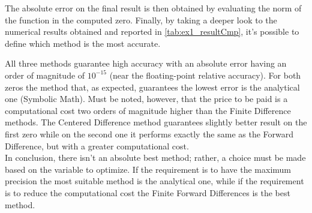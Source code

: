 \documentclass[11pt,a4paper,oneside]{article}
\begin{document}
The absolute error on the final result is then obtained by evaluating the norm of the function in the computed zero. 
Finally, by taking a deeper look to the numerical results obtained and reported in \cref{tab:ex1_resultCmp}, it's possible to define which method is the most accurate.

\begin{table}[ht]
    \centering
    \caption{Methods compare on zeros computation}
    \label{tab:ex1_resultCmp}
    \hspace{0.05\linewidth}     %
\end{table}

All three methods guarantee high accuracy with an absolute error having an order of magnitude of $10^{-15}$ (near the floating-point relative accuracy).
For both zeros the method that, as expected, guarantees the lowest error is the analytical one (Symbolic Math).
Must be noted, however, that the price to be paid is a computational cost two orders of magnitude higher than the Finite Difference methods.
The Centered Difference method guarantees slightly better result on the first zero while on the second one it performs exactly the same as the Forward Difference, but with a greater computational cost.
\\
In conclusion, there isn't an absolute best method; rather, a choice must be made based on the variable to optimize.
If the requirement is to have the maximum precision the most suitable method is the analytical one, while if the requirement is to reduce the computational cost the Finite Forward Differences is the best method.
\end{document}
